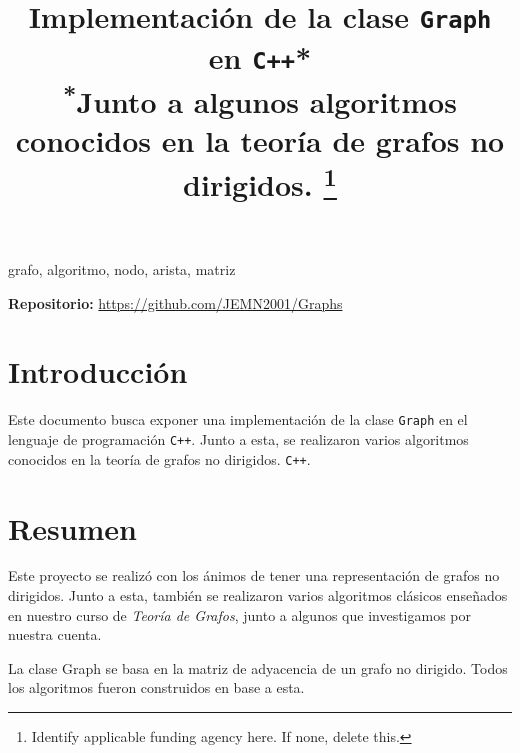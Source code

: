 \documentclass[conference]{IEEEtran}
\begin{document}
\title{Implementación de la clase \texttt{Graph} en \texttt{C++}*\\
{\footnotesize \textsuperscript{*}Junto a algunos algoritmos conocidos en la teoría de grafos no dirigidos.}
\thanks{Identify applicable funding agency here. If none, delete this.}
}

\author{
\and
{}
}


\maketitle

\begin{IEEEkeywords}
grafo, algoritmo, nodo, arista, matriz
\end{IEEEkeywords}

\textbf{Repositorio:} \url{https://github.com/JEMN2001/Graphs}
\section{Introducción}
Este documento busca exponer una implementación de la clase \texttt{Graph} en el lenguaje de programación \texttt{C++}. Junto a esta, se realizaron varios algoritmos conocidos en la teoría de grafos no dirigidos. \texttt{C++}.

\section{Resumen}

Este proyecto se realizó con los ánimos de tener una representación de grafos no dirigidos. Junto a esta, también se realizaron varios algoritmos clásicos enseñados en nuestro curso de \textit{Teoría de Grafos}, junto a algunos que investigamos por nuestra cuenta. 

La clase Graph se basa en la matriz de adyacencia de un grafo no dirigido. Todos los algoritmos fueron construidos en base a esta.
\end{document}
